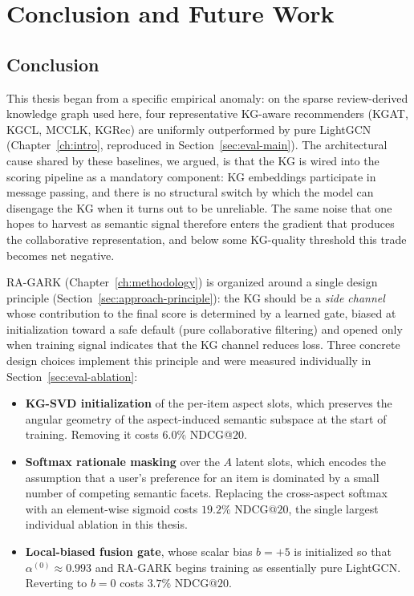 \chapter{Conclusion and Future Work}
\label{ch:conclusion}

\section{Conclusion}
\label{sec:conclude-main}

This thesis began from a specific empirical anomaly: on the sparse review-derived knowledge graph used here, four representative KG-aware recommenders (KGAT, KGCL, MCCLK, KGRec) are uniformly outperformed by pure LightGCN (Chapter~\ref{ch:intro}, reproduced in Section~\ref{sec:eval-main}). The architectural cause shared by these baselines, we argued, is that the KG is wired into the scoring pipeline as a mandatory component: KG embeddings participate in message passing, and there is no structural switch by which the model can disengage the KG when it turns out to be unreliable. The same noise that one hopes to harvest as semantic signal therefore enters the gradient that produces the collaborative representation, and below some KG-quality threshold this trade becomes net negative.

RA-GARK (Chapter~\ref{ch:methodology}) is organized around a single design principle (Section~\ref{sec:approach-principle}): the KG should be a \emph{side channel} whose contribution to the final score is determined by a learned gate, biased at initialization toward a safe default (pure collaborative filtering) and opened only when training signal indicates that the KG channel reduces loss. Three concrete design choices implement this principle and were measured individually in Section~\ref{sec:eval-ablation}:

\begin{itemize}
  \item \textbf{KG-SVD initialization} of the per-item aspect slots, which preserves the angular geometry of the aspect-induced semantic subspace at the start of training. Removing it costs $6.0\%$ NDCG@$20$.
  \item \textbf{Softmax rationale masking} over the $A$ latent slots, which encodes the assumption that a user's preference for an item is dominated by a small number of competing semantic facets. Replacing the cross-aspect softmax with an element-wise sigmoid costs $19.2\%$ NDCG@$20$, the single largest individual ablation in this thesis.
  \item \textbf{Local-biased fusion gate}, whose scalar bias $b = +5$ is initialized so that $\alpha^{(0)} \approx 0.993$ and RA-GARK begins training as essentially pure LightGCN. Reverting to $b = 0$ costs $3.7\%$ NDCG@$20$.
\end{itemize}

